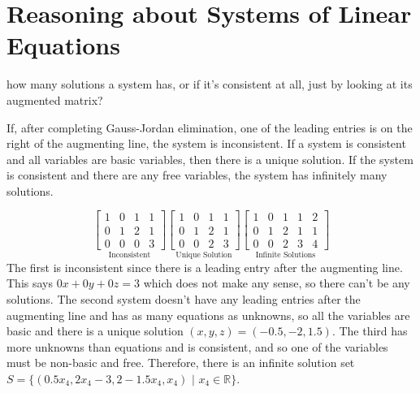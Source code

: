 \documentclass{tufte-book}
\begin{document}
\section{Reasoning about Systems of Linear Equations}

 how many solutions a system has, or if it's consistent at all, just by looking at
its augmented matrix?

If, after completing Gauss-Jordan elimination, one of the leading entries is on the right of the augmenting line,
the system is inconsistent. If a system is consistent and all variables are basic variables, then there is a unique
solution. If the system is consistent and there are any free variables, the system has infinitely many solutions.

\begin{equation*}
	\underset{\text{Inconsistent}}{
		\left[
			\begin{array}{ccc|c}
				1 & 0 & 1 & 1         \\
				0 & 1 & 2 & 1         \\
				0 & 0 & 0 & \boxed{3}
			\end{array}
			\right]
	}
	\underset{\text{Unique Solution}}{
		\left[
			\begin{array}{ccc|c}
				\boxed{1} & 0         & 1         & 1 \\
				0         & \boxed{1} & 2         & 1 \\
				0         & 0         & \boxed{2} & 3
			\end{array}
			\right]
	}
	\underset{\text{Infinite Solutions}}{
		\left[
			\begin{array}{cccc|c}
				1 & 0 & 1 & \boxed{1} & 2 \\
				0 & 1 & 2 & \boxed{1} & 1 \\
				0 & 0 & 2 & \boxed{3} & 4
			\end{array}
			\right]
	}
\end{equation*}
The first is inconsistent since there is a leading entry after the augmenting line. This says $0x+0y+0z=3$ which
does not make any sense, so there can't be any solutions. The second system doesn't have any leading entries after
the augmenting line and has as many equations as unknowns, so all the variables are basic and there is a unique solution
$(x,y,z)=(-0.5,-2,1.5)$. The third has more unknowns than equations and is consistent, and so one of the variables must
be non-basic and free. Therefore, there is an infinite solution set $S=\{(0.5x_4,2x_4-3,2-1.5x_4,x_4)\text{ | }x_4 \in \mathbb{R}\}$.
\end{document}
